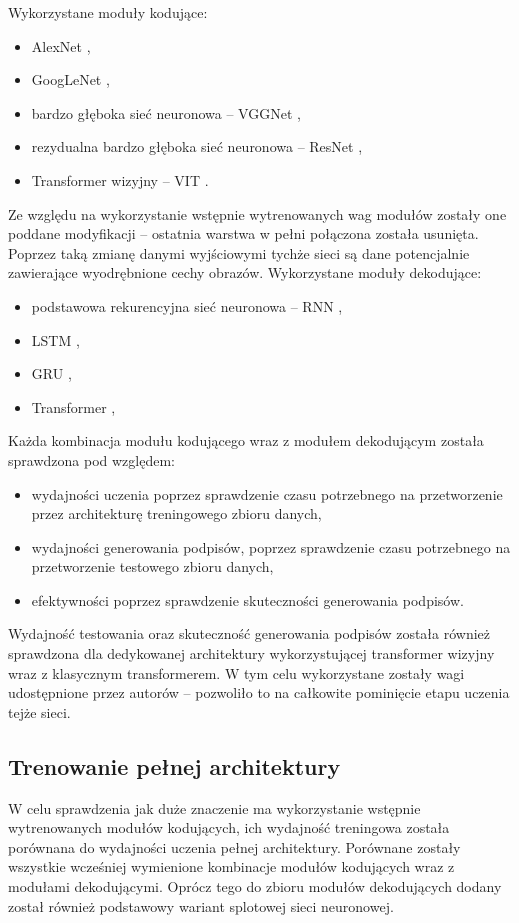 Wykorzystane moduły kodujące:
\begin{itemize}
    \item AlexNet \cite{alexnet},
    \item GoogLeNet \cite{googlenet},
    \item bardzo głęboka sieć neuronowa -- VGGNet \cite{vggnet},
    \item rezydualna bardzo głęboka sieć neuronowa -- ResNet \cite{resnet},
    \item Transformer wizyjny -- VIT \cite{vit}.
\end{itemize}
Ze względu na wykorzystanie wstępnie wytrenowanych wag modułów zostały one poddane modyfikacji -- ostatnia warstwa w pełni połączona została usunięta. Poprzez taką zmianę danymi wyjściowymi tychże sieci są dane potencjalnie zawierające wyodrębnione cechy obrazów.
Wykorzystane moduły dekodujące:
\begin{itemize}
    \item podstawowa rekurencyjna sieć neuronowa -- RNN \cite{rnn},
    \item LSTM \cite{lstm},
    \item GRU \cite{gru},
    \item Transformer \cite{transformer},
\end{itemize}
Każda kombinacja modułu kodującego wraz z modułem dekodującym została sprawdzona pod względem:
\begin{itemize}
    \item wydajności uczenia poprzez sprawdzenie czasu potrzebnego na przetworzenie przez architekturę treningowego zbioru danych,
    \item wydajności generowania podpisów, poprzez sprawdzenie czasu potrzebnego na przetworzenie testowego zbioru danych,
    \item efektywności poprzez sprawdzenie skuteczności generowania podpisów.
\end{itemize}
Wydajność testowania oraz skuteczność generowania podpisów została również sprawdzona dla dedykowanej architektury \cite{wang2022git} wykorzystującej transformer wizyjny wraz z klasycznym transformerem. W tym celu wykorzystane zostały wagi udostępnione przez autorów -- pozwoliło to na całkowite pominięcie etapu uczenia tejże sieci.
\subsection{Trenowanie pełnej architektury}
W celu sprawdzenia jak duże znaczenie ma wykorzystanie wstępnie wytrenowanych modułów kodujących, ich wydajność treningowa została porównana do wydajności uczenia pełnej architektury. Porównane zostały wszystkie wcześniej wymienione kombinacje modułów kodujących wraz z modułami dekodującymi. Oprócz tego do zbioru modułów dekodujących dodany został również podstawowy wariant splotowej sieci neuronowej.
